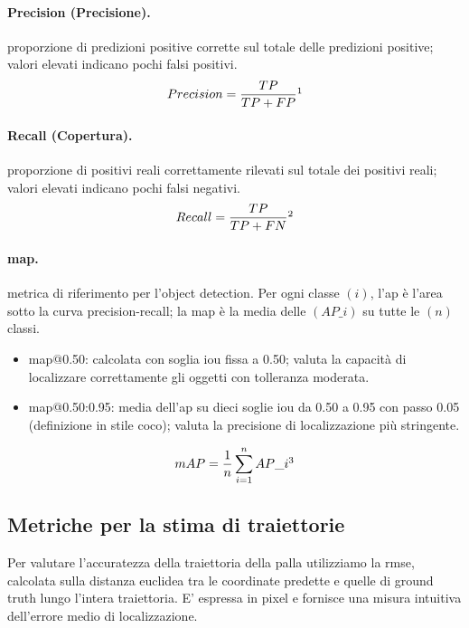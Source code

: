 \documentclass[12pt,a4paper,openright,twoside]{book}
\begin{document}
\paragraph{Precision (Precisione).} proporzione di predizioni positive corrette sul totale delle predizioni positive; 
valori elevati indicano pochi falsi positivi.
\begin{equation}
  \label{eq:precision}
  {Precision} = \frac{TP}{TP + FP}\footnotemark
\end{equation}

\paragraph{Recall (Copertura).} proporzione di positivi reali correttamente rilevati sul totale dei positivi reali; 
valori elevati indicano pochi falsi negativi.
\begin{equation}
  \label{eq:recall}
  {Recall} = \frac{TP}{TP + FN}\footnotemark
\end{equation}

\paragraph{\acf{map}.} metrica di riferimento per l'object detection. 
Per ogni classe $(i)$, l'\ac{ap} è l'area sotto la curva precision-recall; 
la \ac{map} è la media delle $(AP\_i)$ su tutte le $(n)$ classi.
\begin{itemize}
  \item \ac{map}@0.50: calcolata con soglia \ac{iou} fissa a 0.50; valuta la capacità di localizzare 
  correttamente gli oggetti con tolleranza moderata.
  \item \ac{map}@0.50:0.95: media dell'\ac{ap} su dieci soglie \ac{iou} da 0.50 a 0.95 con passo 0.05 
  (definizione in stile \ac{coco}); valuta la precisione di localizzazione più stringente.
\end{itemize}
\begin{equation}
  \label{eq:map}
  {mAP} = \frac{1}{n} \sum_{i=1}^{n} AP\_i \footnotemark
\end{equation}

\subsection{Metriche per la stima di traiettorie}
\label{sec:metriche-traiettorie}
Per valutare l'accuratezza della traiettoria della palla utilizziamo la \ac{rmse}, calcolata sulla distanza euclidea
tra le coordinate predette e quelle di ground truth lungo l'intera traiettoria. E' espressa in pixel e fornisce una misura
intuitiva dell'errore medio di localizzazione.
\end{document}
